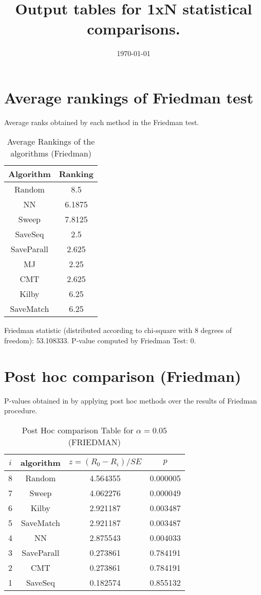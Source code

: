 \documentclass[a4paper,10pt]{article}
\title{Output tables for 1xN statistical comparisons.}
\author{}
\date{\today}
\begin{document}
\begin{landscape}
\pagestyle{empty}
\maketitle
\thispagestyle{empty}

\section{Average rankings of Friedman test}


Average ranks obtained by each method in the Friedman test.

\begin{table}[!htp]
\centering
\begin{tabular}{|c|c|}\hline
Algorithm&Ranking\\\hline
Random&8.5\\NN&6.1875\\Sweep&7.8125\\SaveSeq&2.5\\SaveParall&2.625\\MJ&2.25\\CMT&2.625\\Kilby&6.25\\SaveMatch&6.25\\\hline\end{tabular}
\caption{Average Rankings of the algorithms (Friedman)}
\end{table}

Friedman statistic (distributed according to chi-square with 8 degrees of freedom): 53.108333. \newline P-value computed by Friedman Test: 0.\newline


\newpage

\section{Post hoc comparison (Friedman)}


P-values obtained in by applying post hoc methods over the results of Friedman procedure.

\begin{table}[!htp]
\centering\footnotesize
\begin{tabular}{cccc}
$i$&algorithm&$z=(R_0 - R_i)/SE$&$p$\\
\hline8&Random&4.564355&0.000005\\7&Sweep&4.062276&0.000049\\6&Kilby&2.921187&0.003487\\5&SaveMatch&2.921187&0.003487\\4&NN&2.875543&0.004033\\3&SaveParall&0.273861&0.784191\\2&CMT&0.273861&0.784191\\1&SaveSeq&0.182574&0.855132\\\hline
\end{tabular}
\caption{Post Hoc comparison Table for $\alpha=0.05$ (FRIEDMAN)}
\end{table}
\newpage


\end{landscape}
\end{document}
